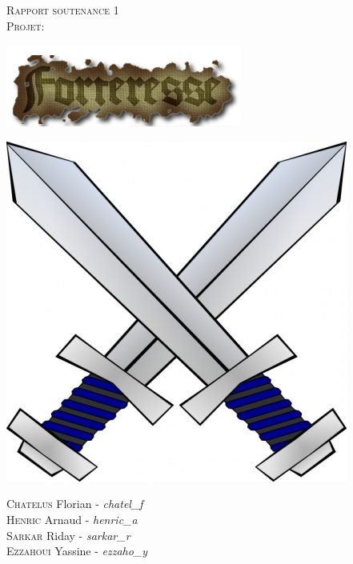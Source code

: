 \documentclass[a4paper, 12pt]{article}
\begin{document}
\begin{titlepage}
  \begin{sffamily}
  \begin{center}


    \textsc{\Huge Rapport soutenance 1}\\[3cm]

    \textsc{\LARGE Projet:}\\[1.5cm]

	\centerline{\includegraphics{coollogo_com-19602433.png}}
	\vfill{
	\centerline{\includegraphics[scale=0.4]{crossed-swords-clip-art-48219.jpg}}}

    \begin{minipage}{0.4\textwidth}
      \begin{flushleft} \large	
      
      \end{flushleft}
    \end{minipage}
	\begin{flushleft}\vfill
      {
       \textsc{Chatelus} Florian - \emph{chatel\_f} \\
       \textsc{Henric} Arnaud - \emph{henric\_a}\\
       \textsc{Sarkar} Riday - \emph{sarkar\_r}\\
       \textsc{Ezzahoui} Yassine - \emph{ezzaho\_y} }
    \end{flushleft}	
  \end{center}
  \end{sffamily}
\end{titlepage}
\end{document}
